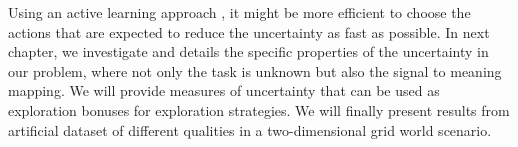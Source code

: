 Using an active learning approach \cite{settles2010active}, it might be more efficient to choose the actions that are expected to reduce the uncertainty as fast as possible. In next chapter, we investigate and details the specific properties of the uncertainty in our problem, where not only the task is unknown but also the signal to meaning mapping. We will provide measures of uncertainty that can be used as exploration bonuses for exploration strategies. We will finally present results from artificial dataset of different qualities in a two-dimensional grid world scenario.









